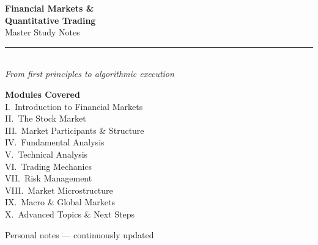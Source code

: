\documentclass[12pt, a4paper]{report}
\begin{document}
\begin{titlepage}
  \centering
  \vspace*{2cm}
  {\fontsize{36}{44}\selectfont\bfseries\color{darkblue} Financial Markets \&}\\[0.2em]
  {\fontsize{36}{44}\selectfont\bfseries\color{darkblue} Quantitative Trading}\\[1em]
  {\Large\color{midblue} Master Study Notes}\\[0.5em]
  \textcolor{gold}{\rule{10cm}{1.5pt}}\\[2em]
  {\large\itshape From first principles to algorithmic execution}\\[3em]
  \begin{tcolorbox}[colback=lightblue, colframe=midblue, width=10cm, halign=center]
    \centering
    \textbf{Modules Covered}\\[0.5em]
    \small
    I.\ Introduction to Financial Markets\\
    II.\ The Stock Market\\
    III.\ Market Participants \& Structure\\
    IV.\ Fundamental Analysis\\
    V.\ Technical Analysis\\
    VI.\ Trading Mechanics\\
    VII.\ Risk Management\\
    VIII.\ Market Microstructure\\
    IX.\ Macro \& Global Markets\\
    X.\ Advanced Topics \& Next Steps
  \end{tcolorbox}
  \vfill
  {\small\color{gray} Personal notes — continuously updated}
\end{titlepage}

\tableofcontents
\clearpage











\end{document}
